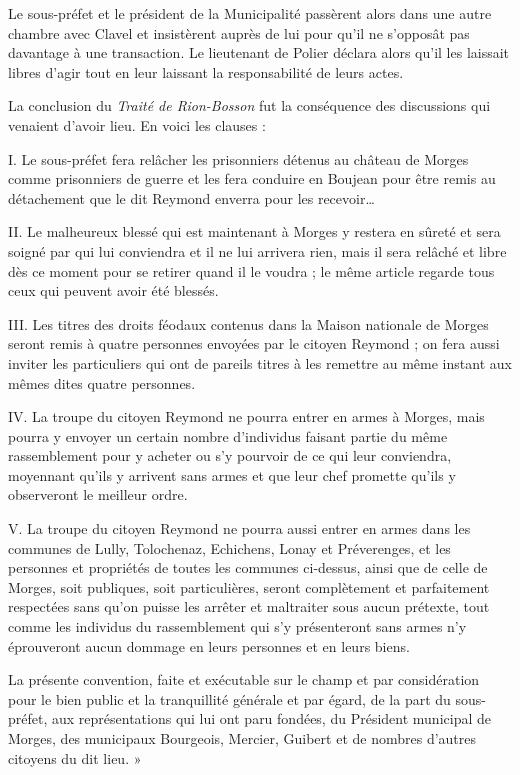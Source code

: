 \documentclass[french,twoside]{book} %
\begin{document}
\noindent Le sous-préfet et le président de la Municipalité passèrent alors dans une autre chambre avec Clavel et insistèrent auprès de lui pour qu’il ne s’opposât pas davantage à une transaction. Le lieutenant de Polier déclara alors qu’il les laissait libres d’agir tout en leur laissant la responsabilité de leurs actes.\par
La conclusion du \emph{Traité de Rion-Bosson} fut la conséquence des discussions qui venaient d’avoir lieu. En voici les clauses :\par
I. Le sous-préfet fera relâcher les prisonniers détenus au château de Morges comme prisonniers de guerre et les fera conduire en Boujean pour être remis au détachement que le dit Reymond enverra pour les recevoir…\par
II. Le malheureux blessé qui est maintenant à Morges y restera en sûreté et sera soigné par qui lui conviendra et il ne lui arrivera rien, mais il sera relâché et libre dès ce moment pour se retirer quand il le voudra ; le même article regarde tous ceux qui peuvent avoir été blessés.\par
III. Les titres des droits féodaux contenus dans la Maison nationale de Morges seront remis à quatre personnes envoyées par le citoyen Reymond ; on fera aussi inviter les particuliers qui ont de pareils titres à les remettre au même instant aux mêmes dites quatre personnes.\par
IV. La troupe du citoyen Reymond ne pourra entrer en armes à Morges, mais pourra y envoyer un certain nombre d’individus faisant partie du même rassemblement pour y acheter ou s’y pourvoir de ce qui leur conviendra, moyennant qu’ils y arrivent sans armes et que leur chef promette qu’ils y observeront le meilleur ordre.\par
V. La troupe du citoyen Reymond ne pourra aussi entrer en armes dans les communes de Lully, Tolochenaz, Echichens, Lonay et Préverenges, et les personnes et propriétés de toutes les communes ci-dessus, ainsi que de celle de Morges, soit publiques, soit particulières, seront complètement et parfaitement respectées sans qu’on puisse les arrêter et maltraiter sous aucun prétexte, tout comme les individus du rassemblement qui s’y présenteront sans armes n’y éprouveront aucun dommage en leurs personnes et en leurs biens.\par
La présente convention, faite et exécutable sur le champ et par considération pour le bien public et la tranquillité générale et par égard, de la part du sous-préfet, aux représentations qui lui ont paru fondées, du Président municipal de Morges, des municipaux Bourgeois, Mercier, Guibert et de nombres d’autres citoyens du dit lieu. »\par
\end{document}

